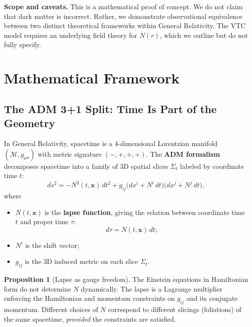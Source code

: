 \documentclass[11pt,a4paper]{article}
\theoremstyle{definition}
\newtheorem{proposition}[theorem]{Proposition}
\begin{document}
\textbf{Scope and caveats.} This is a mathematical proof of concept. We do not claim that dark matter is incorrect. Rather, we demonstrate observational equivalence between two distinct theoretical frameworks within General Relativity. The VTC model requires an underlying field theory for $N(r)$, which we outline but do not fully specify.

\section{Mathematical Framework}
\label{sec:framework}

\subsection{The ADM 3+1 Split: Time Is Part of the Geometry}

In General Relativity, spacetime is a 4-dimensional Lorentzian manifold $(\mathcal{M}, g_{\mu\nu})$ with metric signature $(-,+,+,+)$. The \textbf{ADM formalism} \cite{ADM1959} decomposes spacetime into a family of 3D spatial slices $\Sigma_t$ labeled by coordinate time $t$:
\begin{equation}
    ds^2 = -N^2(t,\mathbf{x})\,dt^2 + g_{ij}\bigl(dx^i + N^i\,dt\bigr)\bigl(dx^j + N^j\,dt\bigr),
\end{equation}
where
\begin{itemize}
    \item $N(t,\mathbf{x})$ is the \textbf{lapse function}, giving the relation between coordinate time $t$ and proper time $\tau$:
    \begin{equation}
        d\tau = N(t,\mathbf{x})\,dt;
    \end{equation}
    \item $N^i$ is the shift vector;
    \item $g_{ij}$ is the 3D induced metric on each slice $\Sigma_t$.
\end{itemize}

\begin{proposition}[Lapse as gauge freedom]
The Einstein equations in Hamiltonian form do not determine $N$ dynamically. The lapse is a Lagrange multiplier enforcing the Hamiltonian and momentum constraints on $g_{ij}$ and its conjugate momentum. Different choices of $N$ correspond to different slicings (foliations) of the same spacetime, \emph{provided} the constraints are satisfied.
\end{proposition}
\end{document}
